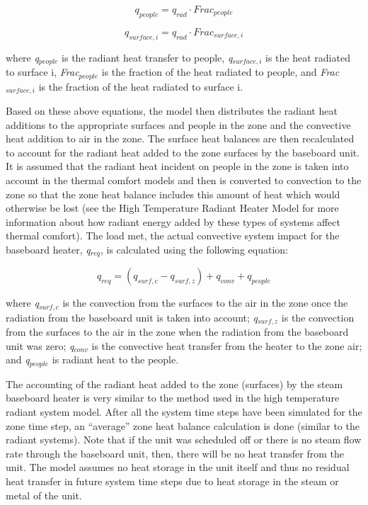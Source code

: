 \begin{equation}
{q_{people}} = {q_{rad}} \cdot Fra{c_{people}}
\end{equation}

\begin{equation}
{q_{surface,i}} = {{q_{rad}} \cdot Fra{c_{surface,i}}}
\end{equation}

where \emph{q\(_{people}\)} is the radiant heat transfer to people, \emph{q\(_{surface,i}\)} is the heat radiated to surface i, \emph{Frac\(_{people}\)} is the fraction of the heat radiated to people, and \emph{Frac\(_{surface,i}\)} is the fraction of the heat radiated to surface i.

Based on these above equations, the model then distributes the radiant heat additions to the appropriate surfaces and people in the zone and the convective heat addition to air in the zone. The surface heat balances are then recalculated to account for the radiant heat added to the zone surfaces by the baseboard unit. It is assumed that the radiant heat incident on people in the zone is taken into account in the thermal comfort models and then is converted to convection to the zone so that the zone heat balance includes this amount of heat which would otherwise be lost (see the High Temperature Radiant Heater Model for more information about how radiant energy added by these types of systems affect thermal comfort). The load met, the actual convective system impact for the baseboard heater, \emph{q\(_{req}\)}, is calculated using the following equation:

\begin{equation}
{q_{req}} = ({q_{surf,c}} - {q_{surf,z}}) + {q_{conv}} + {q_{people}}
\end{equation}

where \emph{q\(_{surf,c}\)} is the convection from the surfaces to the air in the zone once the radiation from the baseboard unit is taken into account; \emph{q\(_{surf,z}\)} is the convection from the surfaces to the air in the zone when the radiation from the baseboard unit was zero; \emph{q\(_{conv}\)} is the convective heat transfer from the heater to the zone air; and \emph{q\(_{people}\)} is radiant heat to the people.

The accounting of the radiant heat added to the zone (surfaces) by the steam baseboard heater is very similar to the method used in the high temperature radiant system model. After all the system time steps have been simulated for the zone time step, an ``average'' zone heat balance calculation is done (similar to the radiant systems).  Note that if the unit was scheduled off or there is no steam flow rate through the baseboard unit, then, there will be no heat transfer from the unit. The model assumes no heat storage in the unit itself and thus no residual heat transfer in future system time steps due to heat storage in the steam or metal of the unit.

